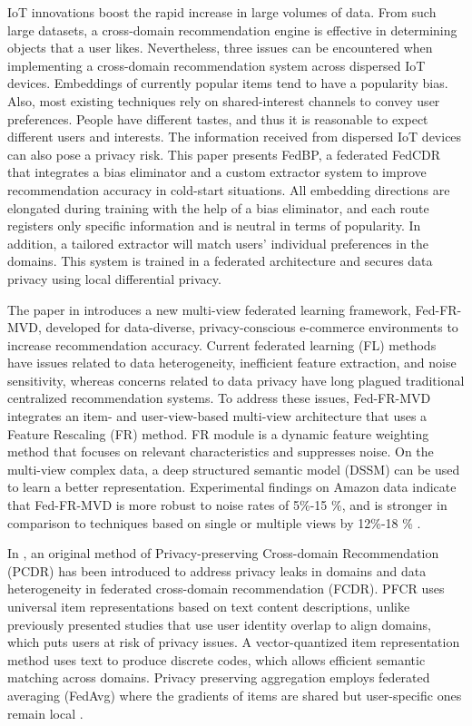 IoT innovations boost the rapid increase in large volumes of data. From such large datasets, a cross-domain recommendation engine is effective in determining objects that a user likes. Nevertheless, three issues can be encountered when implementing a cross-domain recommendation system across dispersed IoT devices. Embeddings of currently popular items tend to have a popularity bias. Also, most existing techniques rely on shared-interest channels to convey user preferences. People have different tastes, and thus it is reasonable to expect different users and interests. The information received from dispersed IoT devices can also pose a privacy risk. This paper presents FedBP, a federated FedCDR that integrates a bias eliminator and a custom extractor system to improve recommendation accuracy in cold-start situations. All embedding directions are elongated during training with the help of a bias eliminator, and each route registers only specific information and is neutral in terms of popularity. In addition, a tailored extractor will match users' individual preferences in the domains. This system is trained in a federated architecture and secures data privacy using local differential privacy.\cite{ref46}

The paper in \cite{ref47} introduces a new multi-view federated learning framework, Fed-FR-MVD, developed for data-diverse, privacy-conscious e-commerce environments to increase recommendation accuracy. Current federated learning (FL) methods have issues related to data heterogeneity, inefficient feature extraction, and noise sensitivity, whereas concerns related to data privacy have long plagued traditional centralized recommendation systems. To address these issues, Fed-FR-MVD integrates an item- and user-view-based multi-view architecture that uses a Feature Rescaling (FR) method. FR module is a dynamic feature weighting method that focuses on relevant characteristics and suppresses noise. On the multi-view complex data, a deep structured semantic model (DSSM) can be used to learn a better representation. Experimental findings on Amazon data indicate that Fed-FR-MVD is more robust to noise rates of 5\%-15 \%, and is stronger in comparison to techniques based on single or multiple views by 12\%-18 \% \cite{ref47}.

In \cite{ref48}, an original method of Privacy-preserving Cross-domain Recommendation (PCDR) has been introduced to address privacy leaks in domains and data heterogeneity in federated cross-domain recommendation (FCDR). PFCR uses universal item representations based on text content descriptions, unlike previously presented studies that use user identity overlap to align domains, which puts users at risk of privacy issues. A vector-quantized item representation method uses text to produce discrete codes, which allows efficient semantic matching across domains. Privacy preserving aggregation employs federated averaging (FedAvg) where the gradients of items are shared but user-specific ones remain local \cite{ref48}.

